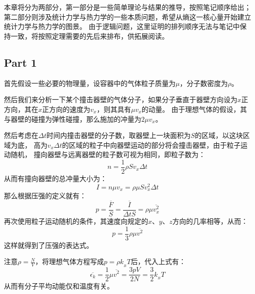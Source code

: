 \documentclass{Physics_H_Notes}
\begin{document}
    \chapter[热力学]{}
        本章将分为两部分，第一部分是一些简单理论与结果的推导，按照笔记顺序给出；
        第二部分则涉及统计力学与热力学的一些本质问题，希望从熵这一核心量开始建立统计力学与热力学的图景。
        由于逻辑问题，这里证明的排列顺序无法与笔记中保持一致，将按照定理需要的先后来排布，供拓展阅读。
        \section{Part 1}
        \begin{prove}
            首先假设一些必要的物理量，设容器中的气体粒子质量为$\mu$，分子数密度为$\rho$。

            然后我们来分析一下某个撞击器壁的气体分子，如果分子垂直于器壁方向设为$x$正方向，其在$x$正方向的速度为$v_x$，则其具有$\mu v_x$的动量。
            由于理想气体的假设，其与器壁的碰撞为弹性碰撞，那么施加的冲量为$2\mu v_x$。

            然后考虑在$\Delta t$时间内撞击器壁的分子数，取器壁上一块面积为$S$的区域，以这块区域为底，
            高为$v_x \Delta t$的区域的粒子中向器壁运动的部分将会撞击器壁，由于粒子运动随机，
            撞向器壁与远离器壁的粒子数可视为相同，即粒子数为：
            \begin{equation}
                n = \frac{1}{2} \rho S v_x \Delta t
                \nonumber
            \end{equation}
            从而有撞向器壁的总冲量大小为：
            \begin{equation}
                I = n \mu v_x = \rho \mu S v_{x}^{2} \Delta t
                \nonumber
            \end{equation}
            那么根据压强的定义就有：
            \begin{equation}
                p = \frac{\overline{F}}{S} = \frac{\overline{I}}{\Delta tS} = \rho \mu \overline{v_{x}^{2}}
                \nonumber
            \end{equation}                                                                      
            再次使用粒子运动随机的条件，其速度向规定的$x$、$y$、$z$方向的几率相等，从而：
            \begin{equation}
                p = \frac{1}{3}\rho \mu \overline{v^{2}}
            \end{equation}          
            这样就得到了压强的表达式。

            注意$\rho = \frac{N}{V}$，将理想气体方程写成$p = \rho k_{_B}T$后，代入上式有：
            \begin{equation}
                \overline{\epsilon_k} = \frac{1}{2}\mu \overline{v^{2}}  = \frac{3pV}{2N} = \frac{3}{2} k_{_B}T  
            \end{equation}
            从而有分子平均动能仅和温度有关。
        \end{prove}
\end{document}

